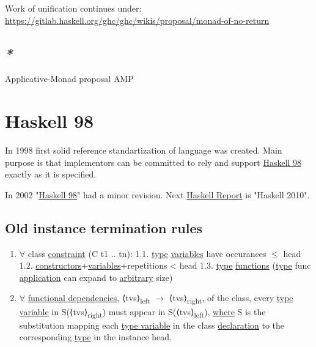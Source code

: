 \documentclass[a4paper,14pt,oneside]{book}
\begin{document}
Work of unification continues under: \url{https://gitlab.haskell.org/ghc/ghc/wikis/proposal/monad-of-no-return}

\subsection{\emph{*}}
\label{sec:orgf0264f7}

\label{orgc98c320}Applicative-Monad proposal
\label{org93d9d60}AMP

\section{\label{org024d392}Haskell 98}
\label{sec:org82a1a74}
In 1998 first solid reference standartization of language was created. Main purpose is that implementors can be committed to rely and support \hyperref[org024d392]{Haskell 98} exactly as it is specified.

In 2002 "\hyperref[org024d392]{Haskell 98}" had a minor revision. Next \hyperref[orge1d4552]{Haskell Report} is "Haskell 2010".

\subsection{\label{org91f37f5}Old instance termination rules}
\label{sec:orgb1cd553}

\begin{enumerate}
\item \(\forall\) class \hyperref[org5110a7a]{constraint} (C t1 .. tn):
1.1. \hyperref[orge4c0722]{type} \hyperref[org189963c]{variables} have occurances \(\le\) head
1.2. \hyperref[org4dc7857]{constructors}+\hyperref[org189963c]{variables}+repetitions < head
1.3. \textlnot{} \hyperref[orge4c0722]{type} \hyperref[org804ddf4]{functions} (\hyperref[orge4c0722]{type} func \hyperref[org0e70ff6]{application} can expand to \hyperref[orge432377]{arbitrary} size)
\item \(\forall\) \hyperref[orgae03a97]{functional dependencies}, ⟨tvs⟩\textsubscript{left} \(\to\) ⟨tvs⟩\textsubscript{right}, of the class, every \hyperref[orgfb1d840]{type variable} in S(⟨tvs⟩\textsubscript{right}) must appear in S(⟨tvs⟩\textsubscript{left}), \hyperref[orgebaad65]{where} S is the substitution mapping each \hyperref[orgfb1d840]{type variable} in the class \hyperref[org84e74ad]{declaration} to the corresponding \hyperref[orge4c0722]{type} in the instance head.
\end{enumerate}
\end{document}
